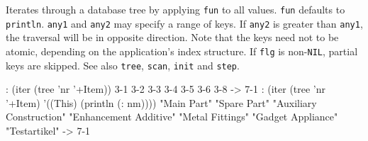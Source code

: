 Iterates through a database tree by applying \texttt{fun} to all values. \texttt{fun}
defaults to \texttt{println}. \texttt{any1} and \texttt{any2} may specify a range of keys. If
\texttt{any2} is greater than \texttt{any1}, the traversal will be in opposite
direction. Note that the keys need not to be atomic, depending on the
application's index structure. If \texttt{flg} is non-\texttt{NIL}, partial keys are
skipped. See also \texttt{tree}, \texttt{scan}, \texttt{init} and \texttt{step}.


\begin{wideverbatim}
: (iter (tree 'nr '+Item))
{3-1}
{3-2}
{3-3}
{3-4}
{3-5}
{3-6}
{3-8}
-> {7-1}
: (iter (tree 'nr '+Item) '((This) (println (: nm))))
"Main Part"
"Spare Part"
"Auxiliary Construction"
"Enhancement Additive"
"Metal Fittings"
"Gadget Appliance"
"Testartikel"
-> {7-1}
\end{wideverbatim}


% 
